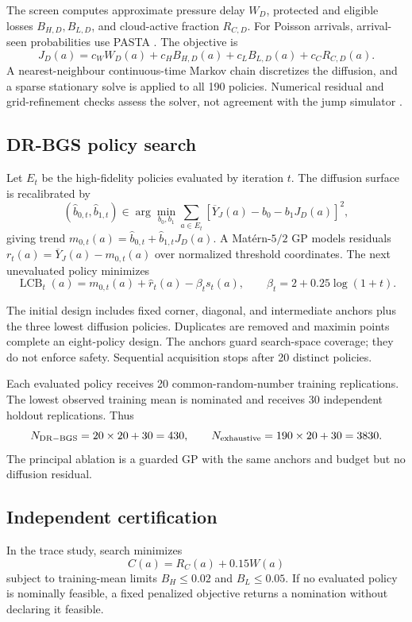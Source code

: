 \documentclass[futureinternet,article,submit,moreauthors]{Definitions/mdpi}
\begin{document}
The screen computes approximate pressure delay $W_D$, protected and eligible losses $B_{H,D},B_{L,D}$, and cloud-active fraction $R_{C,D}$. For Poisson arrivals, arrival-seen probabilities use PASTA \cite{wolff1982pasta}. The objective is
\[
J_D(a)=c_WW_D(a)+c_HB_{H,D}(a)+c_LB_{L,D}(a)+c_CR_{C,D}(a).
\]
A nearest-neighbour continuous-time Markov chain discretizes the diffusion, and a sparse stationary solve is applied to all 190 policies. Numerical residual and grid-refinement checks assess the solver, not agreement with the jump simulator \cite{budhiraja2014numerical,gardiner2009stochastic}.

\subsection{DR-BGS policy search}

Let $E_t$ be the high-fidelity policies evaluated by iteration $t$. The diffusion surface is recalibrated by
\[
(\widehat b_{0,t},\widehat b_{1,t})
\in\arg\min_{b_0,b_1}\sum_{a\in E_t}
[\overline Y_J(a)-b_0-b_1J_D(a)]^2,
\]
giving trend $m_{0,t}(a)=\widehat b_{0,t}+\widehat b_{1,t}J_D(a)$. A Mat\'ern-$5/2$ GP models residuals
$r_t(a)=\overline Y_J(a)-m_{0,t}(a)$ over normalized threshold coordinates. The next unevaluated policy minimizes
\[
\operatorname{LCB}_t(a)=m_{0,t}(a)+\widehat r_t(a)-\beta_ts_t(a),
\qquad
\beta_t=2+0.25\log(1+t).
\]

The initial design includes fixed corner, diagonal, and intermediate anchors plus the three lowest diffusion policies. Duplicates are removed and maximin points complete an eight-policy design. The anchors guard search-space coverage; they do not enforce safety. Sequential acquisition stops after 20 distinct policies.

Each evaluated policy receives 20 common-random-number training replications. The lowest observed training mean is nominated and receives 30 independent holdout replications. Thus
\[
N_{\rm DR-BGS}=20\times20+30=430,
\qquad
N_{\rm exhaustive}=190\times20+30=3830.
\]
The principal ablation is a guarded GP with the same anchors and budget but no diffusion residual.

\subsection{Independent certification}

In the trace study, search minimizes
\[
C(a)=R_C(a)+0.15W(a)
\]
subject to training-mean limits $B_H\leq0.02$ and $B_L\leq0.05$. If no evaluated policy is nominally feasible, a fixed penalized objective returns a nomination without declaring it feasible.
\end{document}
